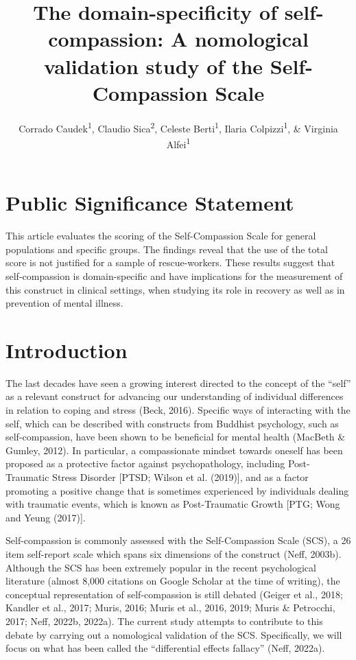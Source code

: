 \documentclass[
  man]{apa7}
\title{The domain-specificity of self-compassion: A nomological validation study of the Self-Compassion Scale}
\author{Corrado Caudek\textsuperscript{1}, Claudio Sica\textsuperscript{2}, Celeste Berti\textsuperscript{1}, Ilaria Colpizzi\textsuperscript{1}, \& Virginia Alfei\textsuperscript{1}}
\date{}
\affiliation{\vspace{0.5cm}\textsuperscript{1} NEUROFARBA Department, Psychology Section, University of Florence, Italy\\\textsuperscript{2} Health Sciences Department, Psychology Section, University of Florence, Italy}
\begin{document}
\maketitle

\hypertarget{public-significance-statement}{%
\section{Public Significance Statement}\label{public-significance-statement}}

This article evaluates the scoring of the Self-Compassion Scale for general populations and specific groups. The findings reveal that the use of the total score is not justified for a sample of rescue-workers. These results suggest that self-compassion is domain-specific and have implications for the measurement of this construct in clinical settings, when studying its role in recovery as well as in prevention of mental illness.

\pagebreak

\hypertarget{introduction}{%
\section{Introduction}\label{introduction}}

The last decades have seen a growing interest directed to the concept of the ``self'' as a relevant construct for advancing our understanding of individual differences in relation to coping and stress (Beck, 2016). Specific ways of interacting with the self, which can be described with constructs from Buddhist psychology, such as self-compassion, have been shown to be beneficial for mental health (MacBeth \& Gumley, 2012). In particular, a compassionate mindset towards oneself has been proposed as a protective factor against psychopathology, including Post-Traumatic Stress Disorder {[}PTSD; Wilson et al. (2019){]}, and as a factor promoting a positive change that is sometimes experienced by individuals dealing with traumatic events, which is known as Post-Traumatic Growth {[}PTG; Wong and Yeung (2017){]}.

Self-compassion is commonly assessed with the Self-Compassion Scale (SCS), a 26 item self-report scale which spans six dimensions of the construct (Neff, 2003b). Although the SCS has been extremely popular in the recent psychological literature (almost 8,000 citations on Google Scholar at the time of writing), the conceptual representation of self-compassion is still debated (Geiger et al., 2018; Kandler et al., 2017; Muris, 2016; Muris et al., 2016, 2019; Muris \& Petrocchi, 2017; Neff, 2022b, 2022a). The current study attempts to contribute to this debate by carrying out a nomological validation of the SCS. Specifically, we will focus on what has been called the ``differential effects fallacy'' (Neff, 2022a).
\end{document}

